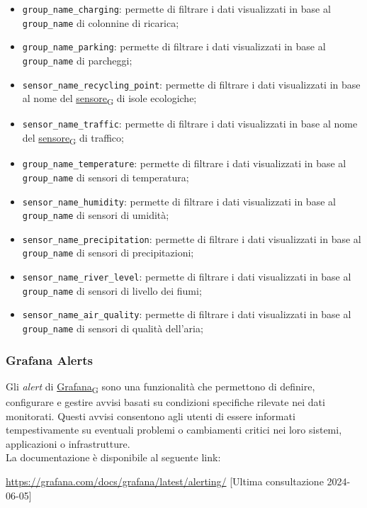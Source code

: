 \begin{itemize}
	\item \texttt{group\_name\_charging}: permette di filtrare i dati visualizzati in base al \texttt{group\_name} di colonnine di ricarica;
	\item \texttt{group\_name\_parking}: permette di filtrare i dati visualizzati in base al \texttt{group\_name} di parcheggi;
	\item \texttt{sensor\_name\_recycling\_point}: permette di filtrare i dati visualizzati in base al nome del \href{https://7last.github.io/docs/pb/documentazione-interna/glossario\#sensore}{sensore\textsubscript{G}} di isole ecologiche;
	\item \texttt{sensor\_name\_traffic}: permette di filtrare i dati visualizzati in base al nome del \href{https://7last.github.io/docs/pb/documentazione-interna/glossario\#sensore}{sensore\textsubscript{G}} di traffico;
\end{itemize}
\begin{itemize}
	\item \texttt{group\_name\_temperature}: permette di filtrare i dati visualizzati in base al \texttt{group\_name} di sensori di temperatura;
	\item \texttt{sensor\_name\_humidity}: permette di filtrare i dati visualizzati in base al \texttt{group\_name} di sensori di umidità;
	\item \texttt{sensor\_name\_precipitation}: permette di filtrare i dati visualizzati in base al \texttt{group\_name} di sensori di precipitazioni;
	\item \texttt{sensor\_name\_river\_level}: permette di filtrare i dati visualizzati in base al \texttt{group\_name} di sensori di livello dei fiumi;
	\item \texttt{sensor\_name\_air\_quality}: permette di filtrare i dati visualizzati in base al \texttt{group\_name} di sensori di qualità dell'aria;
\end{itemize}

\subsubsection{Grafana Alerts}
Gli \textit{alert} di \href{https://7last.github.io/docs/pb/documentazione-interna/glossario\#grafana}{Grafana\textsubscript{G}} sono una funzionalità che permettono di definire, configurare e gestire avvisi basati su condizioni specifiche rilevate nei dati monitorati. Questi avvisi consentono agli utenti di essere informati tempestivamente su eventuali problemi o cambiamenti critici nei loro sistemi, applicazioni o infrastrutture.\\
La documentazione è disponibile al seguente link:
\begin{center}
	\url{https://grafana.com/docs/grafana/latest/alerting/} [Ultima consultazione 2024-06-05]
\end{center}

